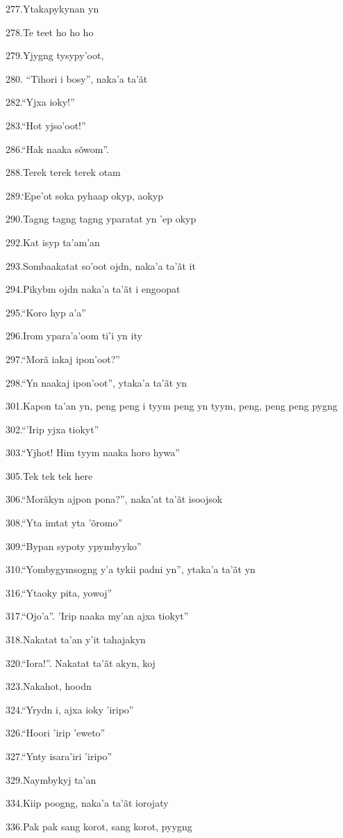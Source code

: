 277.Ytakapykynan yn

278.Te teet ho ho ho

279.Yjygng tysypy'oot,

280. ``Tihori i bosy'', naka'a ta'ãt

282.``Yjxa ioky!''

283.``Hot yjso'oot!''

286.``Hak naaka sõwom''.

288.Terek terek terek otam

289.`Epe'ot soka pyhaap okyp, aokyp

290.Tagng tagng tagng yparatat yn 'ep okyp

292.Kat isyp ta'am'an

293.Sombaakatat so'oot ojdn, naka'a ta'ãt it

294.Pikybm ojdn naka'a ta'ãt i engoopat

295.``Koro hyp a'a''

296.Irom ypara'a'oom ti'i yn ity

297.``Morã iakaj ipon'oot?''

298.``Yn naakaj ipon'oot'', ytaka'a ta'ãt yn

301.Kapon ta'an yn, peng peng i tyym peng yn tyym, peng, peng peng pygng

302.``'Irip yjxa tiokyt''

303.``Yjhot! Him tyym naaka horo hywa''

305.Tek tek tek here

306.``Morãkyn ajpon pona?'', naka'at ta'ãt isoojsok

308.``Yta imtat yta 'õromo''

309.``Bypan sypoty ypymbyyko''

310.``Yombygymsogng y'a tykii padni yn'', ytaka'a ta'ãt yn

316.``Ytaoky pita, yowoj''

317.``Ojo'a''. 'Irip naaka my'an ajxa tiokyt''

318.Nakatat ta'an y'it tahajakyn

320.``Iora!''. Nakatat ta'ãt akyn, koj

323.Nakahot, hoodn

324.``Yrydn i, ajxa ioky 'iripo''

326.``Hoori 'irip 'eweto''

327.``Ynty isara'iri 'iripo''

329.Naymbykyj ta'an

334.Kiip poogng, naka'a ta'ãt iorojaty

336.Pak pak sang korot, sang korot, pyygng

